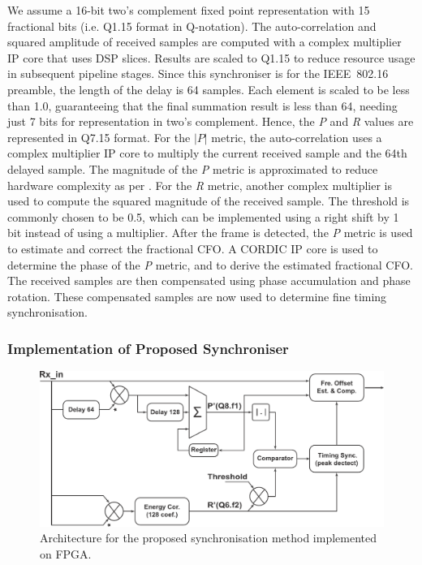 We assume a 16-bit two's complement fixed point representation with 15 fractional bits (i.e. Q1.15 format in Q-notation).
The auto-correlation and squared amplitude of received samples are computed with a complex multiplier IP core that uses DSP slices.
Results are scaled to Q1.15 to reduce resource usage in subsequent pipeline stages.
Since this synchroniser is for the IEEE~802.16 preamble, the length of the delay is 64 samples.
Each element is scaled to be less than 1.0, guaranteeing that the final summation result is less than 64, needing just 7 bits for representation in two's complement.
Hence, the \emph{P} and \emph{R} values are represented in Q7.15 format.
For the $|P|$ metric, the auto-correlation uses a complex multiplier IP core to multiply the current received sample and the 64th delayed sample.
The magnitude of the \emph{P} metric is approximated to reduce hardware complexity as per \cite{Liu2009}.
For the \emph{R} metric, another complex multiplier is used to compute the squared magnitude of the received sample.
The threshold is commonly chosen to be 0.5, which can be implemented using a right shift by 1 bit \cite{Kim2008} instead of using a multiplier.
After the frame is detected, the \emph{P} metric is used to estimate and correct the fractional CFO.
A CORDIC IP core is used to determine the phase of the \emph{P} metric, and to derive the estimated fractional CFO.
The received samples are then compensated using phase accumulation and phase rotation.
These compensated samples are now used to determine fine timing synchronisation.

		\subsubsection{Implementation of Proposed Synchroniser}

\begin{figure}[h]
	\centerline{\includegraphics [width=1\columnwidth] {figures/Pro_Sync.pdf}}
	\caption{Architecture for the proposed synchronisation method implemented on FPGA.}
	\label{fig:Pro-Sync}
\end{figure}

